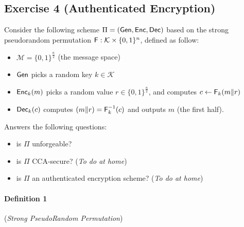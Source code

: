 \subsection{Exercise 4 (Authenticated Encryption)}
Consider the following scheme $\Pi=(\operatorname{\mathsf{Gen}},\operatorname{\mathsf{Enc}},\operatorname{\mathsf{Dec}})$ based on the strong pseudorandom permutation $\operatorname{\mathsf{F}}:\mathcal{K} \times \lbrace 0,1 \rbrace^n$, defined as follow:
\begin{itemize}
\item $\mathcal{M}=\lbrace 0,1\rbrace^{\frac{n}{2}}$ (the message space)
\item $\operatorname{\mathsf{Gen}}$ picks a random key $k \in \mathcal{K}$
\item $\operatorname{\mathsf{Enc}}_k(m)$ picks a random value $r \in \lbrace 0,1\rbrace^{\frac{n}{2}}$, and computes $c \leftarrow \operatorname{\mathsf{F}}_k(m \| r)$
\item $\operatorname{\mathsf{Dec}}_k(c)$ computes $(m\|r)=\operatorname{\mathsf{F}}^{-1}_k(c)$ and outputs $m$ (the first half).
\end{itemize}
Answers the following questions:
\begin{itemize}
\item is $\Pi$ unforgeable?
\item is $\Pi$ CCA-secure? (\emph{To do at home})
\item is $\Pi$ an authenticated encryption scheme? (\emph{To do at home})
\end{itemize}



\paragraph{Definition 1} \label{def: sprp} (\emph{Strong PseudoRandom Permutation})


